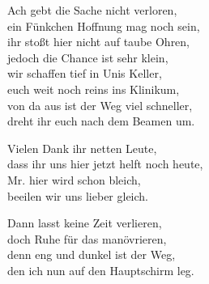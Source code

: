 \begin{verseplay}[7em]
\s{\Paul} Ach gebt die Sache nicht verloren,\\
ein Fünkchen Hoffnung mag noch sein,\\
ihr stoßt hier nicht auf taube Ohren,\\
jedoch die Chance ist sehr klein,\\
wir schaffen tief in Unis Keller,\\
euch weit noch reins ins Klinikum,\\
von da aus ist der Weg viel schneller,\\
dreht ihr euch nach dem Beamen um.

\s{\Frodo} Vielen Dank ihr netten Leute,\\
dass ihr uns hier jetzt helft noch heute,\\
Mr. \Monk hier wird schon bleich,\\
beeilen wir uns lieber gleich.

\s{\Paul} Dann lasst keine Zeit verlieren,\\
doch Ruhe für das manövrieren,\\
denn eng und dunkel ist der Weg,\\
den ich nun auf den Hauptschirm leg.

\end{verseplay}

